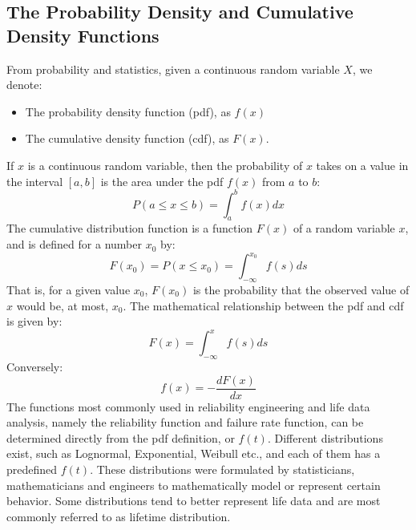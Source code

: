 \subsection{The Probability Density and Cumulative Density Functions}
From probability and statistics, given a continuous random variable $X$, we denote:
\begin{itemize}
	\item The probability density function (pdf), as $f(x)$
	\item The cumulative density function (cdf), as $F(x)$.
\end{itemize}
If $x$ is a continuous random variable, then the probability of $x$ takes on a value in the
interval $[a,b]$ is the area under the pdf $f(x)$ from $a$ to $b$:
\begin{equation}
  P(a\leq x\leq b) = \int_{a}^{b} f(x)dx
\end{equation}
The cumulative distribution function is a function $F(x)$ of a random variable $x$, and is
defined for a number $x_0$ by:
\begin{equation}
  F(x_0) = P(x\leq x_0) = \int_{-\infty}^{x_0} f(s)ds
\end{equation}
That is, for a given value $x_0$, $F(x_0)$ is the probability that the observed value of $x$
would be, at most, $x_0$. The mathematical relationship between the pdf and cdf is given by:
\begin{equation}
  F(x) = \int_{-\infty}^{x} f(s)ds
\end{equation}
Conversely:
\begin{equation}
  f(x) = - \frac{dF(x)}{dx}
\end{equation}
The functions most commonly used in reliability engineering and life data analysis, namely the
reliability function and failure rate function, can be determined directly from the pdf definition,
or $f(t)$. Different distributions exist, such as Lognormal, Exponential, Weibull etc., and each of
them has a predefined $f(t)$. These distributions were formulated by statisticians, mathematicians
and engineers to mathematically model or represent certain behavior. Some distributions tend to better
represent life data and are most commonly referred to as lifetime distribution.

